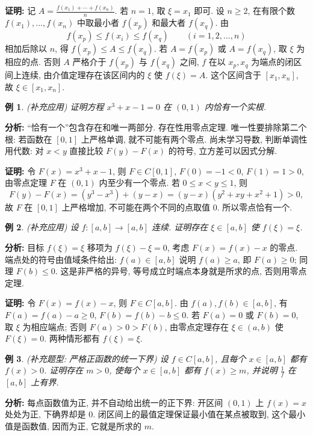 \documentclass[UTF8,openany]{ctexbook}
\theoremstyle{chinesetextbook}
\newtheorem{example}{例}[section]
\newenvironment{cnproof}{\par\indent\textbf{证明:} \ignorespaces}{\par}
\begin{document}
\begin{cnproof}
记 $\displaystyle A=\frac{f(x_1)+\cdots+f(x_n)}n$. 若 $n=1$, 取 $\xi=x_1$ 即可. 设 $n\ge2$, 在有限个数 $f(x_1),\ldots,f(x_n)$ 中取最小者 $f(x_p)$ 和最大者 $f(x_q)$. 由
\[
f(x_p)\le f(x_i)\le f(x_q)\qquad(i=1,2,\ldots,n)
\]
相加后除以 $n$, 得 $f(x_p)\le A\le f(x_q)$. 若 $A=f(x_p)$ 或 $A=f(x_q)$, 取 $\xi$ 为相应的点. 否则 $A$ 严格介于 $f(x_p)$ 与 $f(x_q)$ 之间, $f$ 在以 $x_p,x_q$ 为端点的闭区间上连续, 由介值定理存在该区间内的 $\xi$ 使 $f(\xi)=A$. 这个区间含于 $[x_1,x_n]$, 故 $\xi\in[x_1,x_n]$.
\end{cnproof}
\begin{example}
\textnormal{(补充应用)} 证明方程 $x^3+x-1=0$ 在 $(0,1)$ 内恰有一个实根.
\end{example}
\par\indent\textbf{分析:} “恰有一个”包含存在和唯一两部分. 存在性用零点定理. 唯一性要排除第二个根: 若函数在 $[0,1]$ 上严格单调, 就不可能有两个零点. 尚未学习导数, 判断单调性用代数: 对 $x<y$ 直接比较 $F(y)-F(x)$ 的符号, 立方差可以因式分解.
\begin{cnproof}
令 $F(x)=x^3+x-1$, 则 $F\in C[0,1]$, $F(0)=-1<0$, $F(1)=1>0$, 由零点定理 $F$ 在 $(0,1)$ 内至少有一个零点. 若 $0\le x<y\le1$, 则
\[
F(y)-F(x)=(y^3-x^3)+(y-x)=(y-x)(y^2+xy+x^2+1)>0,
\]
故 $F$ 在 $[0,1]$ 上严格增加, 不可能在两个不同的点取值 $0$. 所以零点恰有一个.
\end{cnproof}
\begin{example}
\textnormal{(补充应用)} 设 $f:[a,b]\to[a,b]$ 连续. 证明存在 $\xi\in[a,b]$ 使 $f(\xi)=\xi$.
\end{example}
\par\indent\textbf{分析:} 目标 $f(\xi)=\xi$ 移项为 $f(\xi)-\xi=0$, 考虑 $F(x)=f(x)-x$ 的零点. 端点处的符号由值域条件给出: $f(a)\in[a,b]$ 说明 $f(a)\ge a$, 即 $F(a)\ge0$; 同理 $F(b)\le0$. 这是非严格的异号, 等号成立时端点本身就是所求的点, 否则用零点定理.
\begin{cnproof}
令 $F(x)=f(x)-x$, 则 $F\in C[a,b]$. 由 $f(a),f(b)\in[a,b]$, 有 $F(a)=f(a)-a\ge0$, $F(b)=f(b)-b\le0$. 若 $F(a)=0$ 或 $F(b)=0$, 取 $\xi$ 为相应端点; 否则 $F(a)>0>F(b)$, 由零点定理存在 $\xi\in(a,b)$ 使 $F(\xi)=0$. 两种情形都有 $f(\xi)=\xi$.
\end{cnproof}
\begin{example}
\textnormal{(补充题型: 严格正函数的统一下界)} 设 $f\in C[a,b]$, 且每个 $x\in[a,b]$ 都有 $f(x)>0$. 证明存在 $m>0$, 使每个 $x\in[a,b]$ 都有 $f(x)\ge m$, 并说明 $\displaystyle\frac1f$ 在 $[a,b]$ 上有界.
\end{example}
\par\indent\textbf{分析:} 每点函数值为正, 并不自动给出统一的正下界: 开区间 $(0,1)$ 上 $f(x)=x$ 处处为正, 下确界却是 $0$. 闭区间上的最值定理保证最小值在某点被取到, 这个最小值是函数值, 因而为正, 它就是所求的 $m$.
\end{document}
